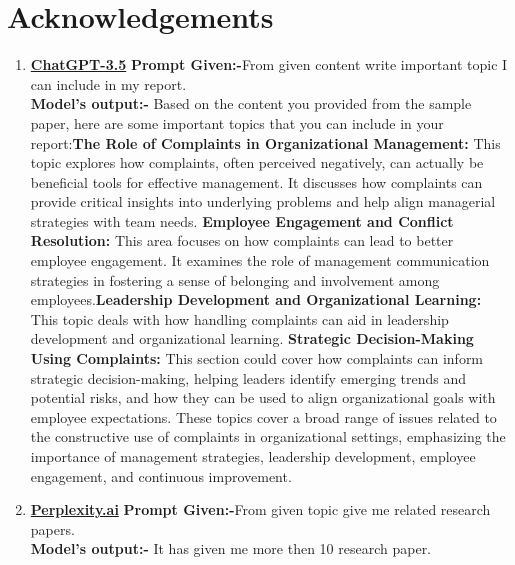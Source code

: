 \documentclass[runningheads]{llncs}
\begin{document}
\section*{Acknowledgements}
\begin{enumerate} 
    \item \textbf{\href{https://chat.openai.com/}{ChatGPT-3.5}}
     \textbf{Prompt Given:-}From given content write important topic I can include in my report.
    \\ \textbf{Model's output:-} 
        Based on the content you provided from the sample paper, here are some important topics that you can include in your report:\textbf{The Role of Complaints in Organizational Management:} This topic explores how complaints, often perceived negatively, can actually be beneficial tools for effective management. It discusses how complaints can provide critical insights into underlying problems and help align managerial strategies with team needs.
 \textbf{Employee Engagement and Conflict Resolution:} This area focuses on how complaints can lead to better employee engagement. It examines the role of management communication strategies in fostering a sense of belonging and involvement among employees.\textbf{Leadership Development and Organizational Learning:} This topic deals with how handling complaints can aid in leadership development and organizational learning. \textbf{Strategic Decision-Making Using Complaints:} This section could cover how complaints can inform strategic decision-making, helping leaders identify emerging trends and potential risks, and how they can be used to align organizational goals with employee expectations.
These topics cover a broad range of issues related to the constructive use of complaints in organizational settings, emphasizing the importance of management strategies, leadership development, employee engagement, and continuous improvement.
\item \textbf{\href{https://www.perplexity.ai/}{Perplexity.ai}}
\textbf{Prompt Given:-}From given topic give me related research papers.
    \\ \textbf{Model's output:-} It has given me more then 10 research paper.
\end{enumerate}




\end{document}
